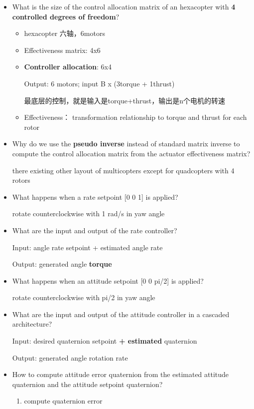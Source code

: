 \documentclass[]{article}
\begin{document}
\begin{itemize}
\item
  What is the size of the control allocation matrix of an hexacopter
  with \textbf{4 controlled degrees of freedom}?

  \begin{itemize}
  \item
    hexacopter 六轴，6motors
  \item
    Effectiveness matrix: 4x6
  \item
    \textbf{Controller allocation}: 6x4

    Output: 6 motors; input B x (3torque + 1thrust)

    最底层的控制，就是输入是torque+thrust，输出是n个电机的转速
  \item
    Effectiveness： transformation relationship to torque and thrust for
    each rotor
  \end{itemize}
\item
  Why do we use the \textbf{pseudo inverse} instead of standard matrix
  inverse to compute the control allocation matrix from the actuator
  effectiveness matrix?

  there existing other layout of multicopters except for quadcopters
  with 4 rotors
\item
  What happens when a rate setpoint {[}0 0 1{]} is applied?

  rotate counterclockwise with 1 rad/s in yaw angle
\item
  What are the input and output of the rate controller?

  Input: angle rate setpoint + estimated angle rate

  Output: generated angle \textbf{torque}
\item
  What happens when an attitude setpoint {[}0 0 pi/2{]} is applied?

  rotate counterclockwise with pi/2 in yaw angle
\item
  What are the input and output of the attitude controller in a cascaded
  architecture?

  Input: desired quaternion setpoint \textbf{+ estimated} quaternion

  Output: generated angle rotation rate
\item
  How to compute attitude error quaternion from the estimated attitude
  quaternion and the attitude setpoint quaternion?

  \begin{enumerate}
  \def\labelenumi{\arabic{enumi}.}
  \item
    compute quaternion error


\end{enumerate}
\end{itemize}
\end{document}
